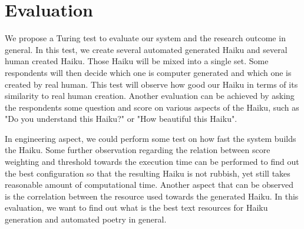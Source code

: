 \section{Evaluation}


We propose a Turing test to evaluate our system and the research outcome in general. In this test, we create several automated generated Haiku and several human created Haiku. Those Haiku will be mixed into a single set. Some respondents will then decide which one is computer generated and which one is created by real human. This test will observe how good our Haiku in terms of its similarity to real human creation. Another evaluation can be achieved by asking the respondents some question and score on various aspects of the Haiku, such as "Do you understand this Haiku?" or "How beautiful this Haiku". 


In engineering aspect, we could perform some test on how fast the system builds the Haiku. Some further observation regarding the relation between score weighting and threshold towards the execution time can be performed to find out the best configuration so that the resulting Haiku is not rubbish, yet still takes reasonable amount of computational time. Another aspect that can be observed is the correlation between the resource used towards the generated Haiku. In this evaluation, we want to find out what is the best text resources for Haiku generation and automated poetry in general.